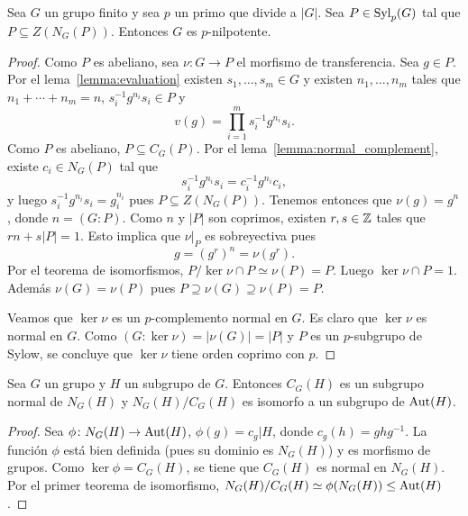 \begin{theorem}[Burnside]
	\label{theorem:Burnside:normal_complement}
	Sea $G$ un grupo finito y sea $p$ un primo que divide a $|G|$. Sea
	$P\in\mathrm{Syl}_p(G)$ tal que $P\subseteq Z(N_G(P))$. Entonces $G$ es
	$p$-nilpotente.
\end{theorem}

\begin{proof}
	Como $P$ es abeliano, sea $\nu\colon G\to P$ el morfismo de transferencia.
	Sea $g\in P$.  Por el lema~\ref{lemma:evaluation} existen $s_1,\dots,s_m\in
	G$ y existen $n_1,\dots,n_m$ tales que $n_1+\cdots+n_m=n$,
	$s_i^{-1}g^{n_i}s_i\in P$ y 
	\[
		v(g)=\prod_{i=1}^m s_i^{-1}g^{n_i}s_i.
	\]
	Como $P$ es abeliano, $P\subseteq C_G(P)$. Por 
	el lema~\ref{lemma:normal_complement}, existe $c_i\in N_G(P)$ tal
	que 
	\[
	s_i^{-1}g^{n_i}s_i=c_i^{-1}g^{n_i}c_i,
	\]
	y luego $s_i^{-1}g^{n_i}s_i=g_i^{n_i}$ pues $P\subseteq Z(N_G(P))$. Tenemos
	entonces que $\nu(g)=g^n$, donde $n=(G:P)$. Como $n$ y $|P|$ son coprimos,
	existen $r,s\in\mathbb{Z}$ tales que $rn+s|P|=1$. Esto implica que $\nu|_P$ es
	sobreyectiva pues
	\[
	g=(g^r)^n=\nu(g^r).
	\]
	Por el teorema de isomorfismos, $P/\ker\nu\cap P\simeq\nu(P)=P$. 
	Luego $\ker\nu\cap P=1$. Además $\nu(G)=\nu(P)$ pues 
	$P\supseteq \nu(G)\supseteq \nu(P)=P$.
	
	Veamos que $\ker\nu$ es un $p$-complemento normal en $G$. Es claro que $\ker\nu$ es normal en $G$. 
	Como $(G:\ker\nu)=|\nu(G)|=|P|$ y $P$ es un $p$-subgrupo de Sylow, se concluye que $\ker\nu$ tiene orden coprimo con $p$.
\end{proof}



\begin{lemma}
	\label{lemma:NC}
	Sea $G$ un grupo y $H$ un subgrupo de $G$. Entonces $C_G(H)$ es un subgrupo
	normal de $N_G(H)$ y $N_G(H)/C_G(H)$ es isomorfo a un subgrupo de
	$\operatorname{Aut}(H)$.
\end{lemma}

\begin{proof}
	Sea $\phi\colon N_G(H)\to\operatorname{Aut}(H)$,  $\phi(g)=c_g|H$, donde
	$c_g(h)=ghg^{-1}$.  La función $\phi$ está bien definida (pues su dominio
	es $N_G(H)$) y es morfismo de grupos. Como $\ker\phi=C_G(H)$, se tiene que
	$C_G(H)$ es normal en $N_G(H)$. Por el primer teorema de isomorfismo,
	$N_G(H)/C_G(H)\simeq\phi(N_G(H))\leq\operatorname{Aut}(H)$.
\end{proof}

